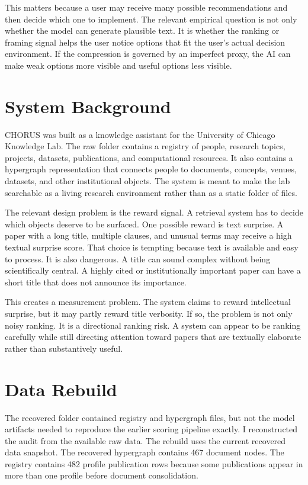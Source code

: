 \documentclass[11pt]{article}
\begin{document}
This matters because a user may receive many possible recommendations and then
decide which one to implement. The relevant empirical question is not only
whether the model can generate plausible text. It is whether the ranking or
framing signal helps the user notice options that fit the user's actual
decision environment. If the compression is governed by an imperfect proxy, the
AI can make weak options more visible and useful options less visible.

\section{System Background}

CHORUS was built as a knowledge assistant for the University of Chicago
Knowledge Lab. The raw folder contains a registry of people, research topics,
projects, datasets, publications, and computational resources. It also contains
a hypergraph representation that connects people to documents, concepts,
venues, datasets, and other institutional objects. The system is meant to make
the lab searchable as a living research environment rather than as a static
folder of files.

The relevant design problem is the reward signal. A retrieval system has to
decide which objects deserve to be surfaced. One possible reward is text
surprise. A paper with a long title, multiple clauses, and unusual terms may
receive a high textual surprise score. That choice is tempting because text is
available and easy to process. It is also dangerous. A title can sound complex
without being scientifically central. A highly cited or institutionally
important paper can have a short title that does not announce its importance.

This creates a measurement problem. The system claims to reward intellectual
surprise, but it may partly reward title verbosity. If so, the problem is not
only noisy ranking. It is a directional ranking risk. A system can appear to be ranking carefully while still directing attention toward papers that are textually elaborate rather than substantively useful.

\section{Data Rebuild}

The recovered folder contained registry and hypergraph files, but not the model artifacts needed to reproduce the earlier scoring pipeline exactly. I reconstructed the audit from the available raw data. The rebuild uses the current recovered data snapshot. The recovered hypergraph contains 467 document nodes.
The registry contains 482 profile publication rows because some publications
appear in more than one profile before document consolidation.
\end{document}
